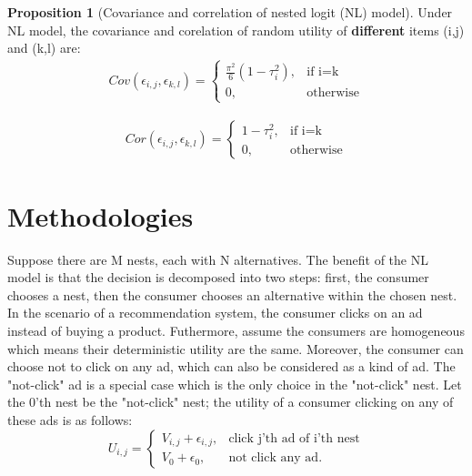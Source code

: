 \documentclass[12pt]{article}
\theoremstyle{definition}
\newtheorem{prop}[theorem]{Proposition}
\begin{document}
\begin{sloppypar}
\begin{prop}[Covariance and correlation of nested logit (NL) model]\label{prop:3}
    Under NL model, the covariance and corelation of random utility of \textbf{different} items (i,j) and (k,l) are:
    \begin{align*}
        Cov(\epsilon_{i,j}, \epsilon_{k,l}) = 
        \begin{cases}
            \frac{\pi^2}{6}(1-\tau_i^2), & \text{if i=k} \\
            0, & \text{otherwise}
        \end{cases}
    \end{align*}

    \begin{align*}
        Cor(\epsilon_{i,j}, \epsilon_{k,l}) =
        \begin{cases}
            1-\tau_i^2, & \text{if i=k} \\
            0, & \text{otherwise}
        \end{cases}
    \end{align*}
\end{prop}

\section{Methodologies}
Suppose there are M nests, each with N alternatives. The benefit of the NL model is that the decision is decomposed into two steps: first, the consumer chooses a nest, then the consumer chooses an alternative within the chosen nest. In the scenario of a recommendation system, the consumer clicks on an ad instead of buying a product. Futhermore, assume the consumers are homogeneous which means their deterministic utility are the same. Moreover, the consumer can choose not to click on any ad, which can also be considered as a kind of ad. The "not-click" ad is a special case which is the only choice in the "not-click" nest. Let the 0'th nest be the "not-click" nest; the utility of a consumer clicking on any of these ads is as follows:
\begin{equation}\label{eq: utility}
    U_{i,j} = 
    \begin{cases}
        V_{i,j} + \epsilon_{i,j}, &\text{click j'th ad of i'th nest} \\
        V_0 + \epsilon_0, &\text{not click any ad}.     
    \end{cases}
\end{equation}


\end{sloppypar}
\end{document}

